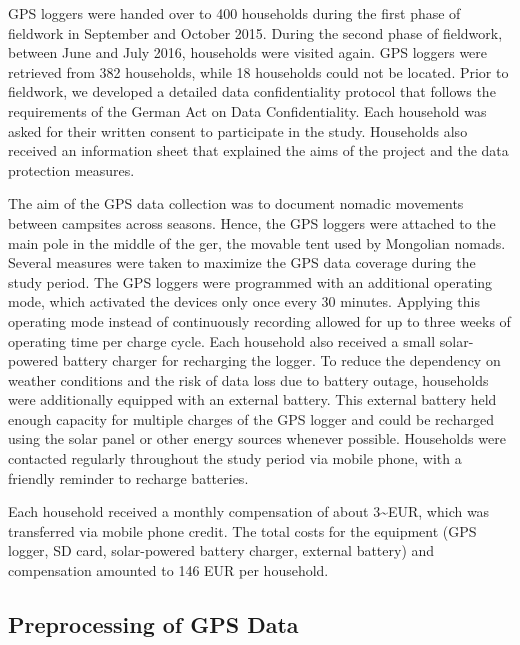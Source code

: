 \documentclass[]{elsarticle} %
\begin{document}
GPS loggers were handed over to 400 households during the first phase of
fieldwork in September and October 2015. During the second phase of
fieldwork, between June and July 2016, households were visited again.
GPS loggers were retrieved from 382 households, while 18 households
could not be located. Prior to fieldwork, we developed a detailed data
confidentiality protocol that follows the requirements of the German Act
on Data Confidentiality. Each household was asked for their written
consent to participate in the study. Households also received an
information sheet that explained the aims of the project and the data
protection measures.

The aim of the GPS data collection was to document nomadic movements
between campsites across seasons. Hence, the GPS loggers were attached
to the main pole in the middle of the ger, the movable tent used by
Mongolian nomads. Several measures were taken to maximize the GPS data
coverage during the study period. The GPS loggers were programmed with
an additional operating mode, which activated the devices only once
every 30 minutes. Applying this operating mode instead of continuously
recording allowed for up to three weeks of operating time per charge
cycle. Each household also received a small solar-powered battery
charger for recharging the logger. To reduce the dependency on weather
conditions and the risk of data loss due to battery outage, households
were additionally equipped with an external battery. This external
battery held enough capacity for multiple charges of the GPS logger and
could be recharged using the solar panel or other energy sources
whenever possible. Households were contacted regularly throughout the
study period via mobile phone, with a friendly reminder to recharge
batteries.

Each household received a monthly compensation of about
3\textasciitilde EUR, which was transferred via mobile phone credit. The
total costs for the equipment (GPS logger, SD card, solar-powered
battery charger, external battery) and compensation amounted to 146 EUR
per household.

\hypertarget{preprocessing-of-gps-data}{%
\subsection{Preprocessing of GPS Data}\label{preprocessing-of-gps-data}}
\end{document}
